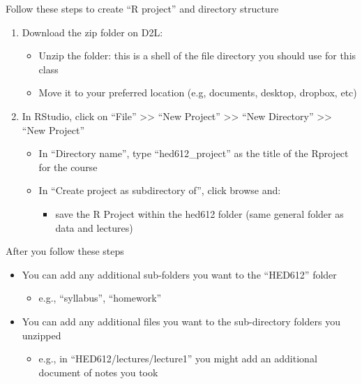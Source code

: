 \documentclass[
  8pt,
  ignorenonframetext,
  dvipsnames]{beamer}
\providecommand{\tightlist}{%
  \setlength{\itemsep}{0pt}\setlength{\parskip}{0pt}}
\let\olditem\item
\renewcommand{\item}{%
  \olditem\vspace{4pt}
}
\begin{document}
\begin{frame}{Follow these steps to create ``R project'' and directory
structure}
\protect\hypertarget{follow-these-steps-to-create-r-project-and-directory-structure}{}

\begin{enumerate}
\tightlist
\item
  Download the zip folder on D2L:

  \begin{itemize}
  \tightlist
  \item
    Unzip the folder: this is a shell of the file directory you should
    use for this class
  \item
    Move it to your preferred location (e.g, documents, desktop,
    dropbox, etc)
  \end{itemize}
\item
  In RStudio, click on ``File'' \textgreater\textgreater{} ``New
  Project'' \textgreater\textgreater{} ``New Directory''
  \textgreater\textgreater{} ``New Project''

  \begin{itemize}
  \tightlist
  \item
    In ``Directory name'', type ``hed612\_project'' as the title of the
    Rproject for the course
  \item
    In ``Create project as subdirectory of'', click browse and:

    \begin{itemize}
    \tightlist
    \item
      save the R Project within the hed612 folder (same general folder
      as data and lectures)
    \end{itemize}
  \end{itemize}
\end{enumerate}

\end{frame}

\begin{frame}{After you follow these steps}
\protect\hypertarget{after-you-follow-these-steps}{}

\begin{itemize}
\tightlist
\item
  You can add any additional sub-folders you want to the ``HED612''
  folder

  \begin{itemize}
  \tightlist
  \item
    e.g., ``syllabus'', ``homework''
  \end{itemize}
\item
  You can add any additional files you want to the sub-directory folders
  you unzipped

  \begin{itemize}
  \tightlist
  \item
    e.g., in ``HED612/lectures/lecture1'' you might add an additional
    document of notes you took
  \end{itemize}
\end{itemize}

\end{frame}
\end{document}
